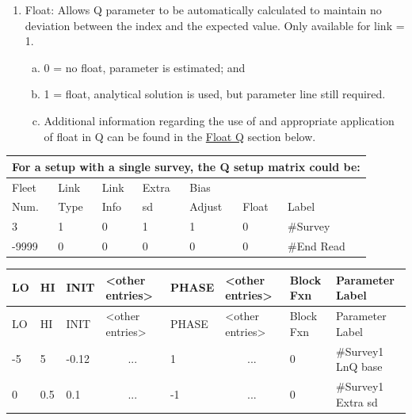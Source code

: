 \begin{enumerate}
\begin{enumerate}[(a)]
	\end{enumerate}
	\item Float: Allows Q parameter to be automatically calculated to maintain no deviation between the index and the expected value. Only available for link = 1.
	\begin{enumerate}[(a)]
		\item 0 = no float, parameter is estimated; and
		\item 1 = float, analytical solution is used, but parameter line still required.
		\item Additional information regarding the use of and appropriate application of float in Q can be found in the \hyperlink{FloatQ}{Float Q} section below.
	\end{enumerate}
\end{enumerate}

\begin{longtable}{p{2cm} p{2cm} p{2cm} p{2cm} p{2cm} p{1.3cm} p{2.3cm}}
	\multicolumn{7}{l}{For a setup with a single survey, the Q setup matrix could be:} \\
	\hline
	Fleet \Tstrut & Link & Link & Extra    & Bias   & & \\
	Num.          & Type & Info & \gls{sd} & Adjust & Float & Label \Bstrut\\
	\hline
	3 & 1 & 0 & 1 & 1 & 0 & \#Survey \Tstrut\\
	-9999 & 0 & 0 & 0 & 0 & 0 & \#End Read \Bstrut\\
	\hline
\end{longtable}


\begin{longtable}{p{1cm} p{1cm} p{1cm} p{1.5cm} p{1.5cm} p{1.5cm} p{1.75cm} p{4cm}}
	\hline
	LO \Tstrut & HI & INIT & <other entries> & PHASE & <other entries> & Block Fxn & Parameter Label \Bstrut\\
	\hline
	\endfirsthead

	\hline
	LO \Tstrut & HI & INIT & <other entries> & PHASE & <other entries> & Block Fxn & Parameter Label \Bstrut\\
	\hline
	\endhead

	\hline
	\endfoot
	\endlastfoot

	-5 & 5 & -0.12 & \multicolumn{1}{c}{...} &  1 & \multicolumn{1}{c}{...} & 0 & \#Survey1 LnQ base \Tstrut\\
	 0 & 0.5 & 0.1 & \multicolumn{1}{c}{...} & -1 & \multicolumn{1}{c}{...} & 0 & \#Survey1 Extra \gls{sd} \Bstrut\\
	\hline
\end{longtable}


